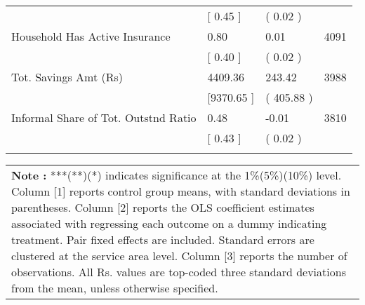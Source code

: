 \begin{center}
\begin{supertabular}{l C{2.5cm} C{2.5cm} C{2.5cm}}
 &[   0.45 ]& (   0.02 ) & \\
\hspace{0.4cm} Household Has Active Insurance &    0.80&    0.01&    4091\\
 &[   0.40 ]& (   0.02 ) & \\
\hspace{0.4cm} Tot. Savings Amt (Rs) & 4409.36&  243.42&    3988\\
 &[9370.65 ]& ( 405.88 ) & \\
\hspace{0.4cm} Informal Share of Tot. Outstnd Ratio &    0.48&   -0.01&    3810\\
 &[   0.43 ]& (   0.02 ) & \\
\\ \end{supertabular}
\footnotesize \begin{tabular}{p{17cm}} 
\textbf{Note :} ***(**)(*) indicates significance at the 1\%(5\%)(10\%) level. Column [1] reports control group means, with standard deviations in parentheses. Column [2] reports the OLS coefficient estimates associated with regressing each outcome on a dummy indicating treatment. Pair fixed effects are included. Standard errors are clustered at the service area level. Column [3] reports the number of observations. All Rs. values are top-coded three standard deviations from the mean, unless otherwise specified. 
 \end{tabular} \end{center}